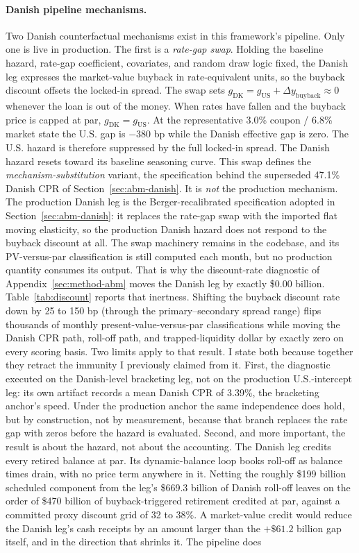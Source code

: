 \documentclass[12pt]{article}
\begin{document}
\paragraph{Danish pipeline mechanisms.}
Two Danish counterfactual mechanisms exist in this framework's pipeline. Only one is live in production. The first is a \emph{rate-gap swap}. Holding the baseline hazard, rate-gap coefficient, covariates, and random draw logic fixed, the Danish leg expresses the market-value buyback in rate-equivalent units, so the buyback discount offsets the locked-in spread. The swap sets $g_{\mathrm{DK}} = g_{\mathrm{US}} + \Delta y_{\mathrm{buyback}} \approx 0$ whenever the loan is out of the money. When rates have fallen and the buyback price is capped at par, $g_{\mathrm{DK}} = g_{\mathrm{US}}$. At the representative 3.0\% coupon / 6.8\% market state the U.S. gap is $-380$ bp while the Danish effective gap is zero. The U.S. hazard is therefore suppressed by the full locked-in spread. The Danish hazard resets toward its baseline seasoning curve. This swap defines the \emph{mechanism-substitution} variant, the specification behind the superseded 47.1\% Danish CPR of Section~\ref{sec:abm-danish}. It is \emph{not} the production mechanism. The production Danish leg is the Berger-recalibrated specification adopted in Section~\ref{sec:abm-danish}: it replaces the rate-gap swap with the imported flat moving elasticity, so the production Danish hazard does not respond to the buyback discount at all. The swap machinery remains in the codebase, and its PV-versus-par classification is still computed each month, but no production quantity consumes its output. That is why the discount-rate diagnostic of Appendix~\ref{sec:method-abm} moves the Danish leg by exactly \$0.00 billion. Table~\ref{tab:discount} reports that inertness. Shifting the buyback discount rate down by 25 to 150 bp (through the primary--secondary spread range) flips thousands of monthly present-value-versus-par classifications while moving the Danish CPR path, roll-off path, and trapped-liquidity dollar by exactly zero on every scoring basis. Two limits apply to that result. I state both because together they retract the immunity I previously claimed from it. First, the diagnostic executed on the Danish-level bracketing leg, not on the production U.S.-intercept leg: its own artifact records a mean Danish CPR of 3.39\%, the bracketing anchor's speed. Under the production anchor the same independence does hold, but by construction, not by measurement, because that branch replaces the rate gap with zeros before the hazard is evaluated. Second, and more important, the result is about the hazard, not about the accounting. The Danish leg credits every retired balance at par. Its dynamic-balance loop books roll-off as balance times drain, with no price term anywhere in it. Netting the roughly \$199 billion scheduled component from the leg's \$669.3 billion of Danish roll-off leaves on the order of \$470 billion of buyback-triggered retirement credited at par, against a committed proxy discount grid of 32 to 38\%. A market-value credit would reduce the Danish leg's cash receipts by an amount larger than the $+\$61.2$ billion gap itself, and in the direction that shrinks it. The pipeline does 
\end{document}
